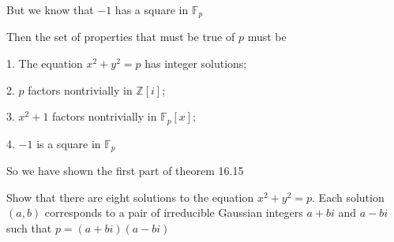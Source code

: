 \documentclass[12pt]{article}
\begin{document}
\begin{itemize}
But we know that $-1$ has a square in $\mathbb{F}_p$ 

Then the set of properties that must be true of $p$ must be

1. The equation $x^2 + y^2 = p$ has integer solutions;

2. $p$ factors nontrivially in $\mathbb{Z}[i]$;

3. $x^2 + 1$ factors nontrivially in $\mathbb{F}_p[x]$;

4. $-1$ is a square in $\mathbb{F}_p$

So we have shown the first part of theorem 16.15

Show that there are eight solutions to the equation $x^2 + y^2 = p$. Each solution $(a,b)$ corresponds to a pair of irreducible Gaussian integers $a + bi$ and $a-bi$ such that $p = (a+bi)(a-bi)$



\end{itemize}
\end{document}
